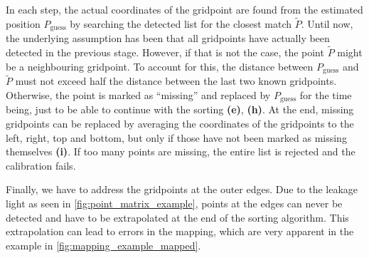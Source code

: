 In each step, the actual coordinates of the gridpoint are found from the estimated position $P_\text{guess}$ by searching the detected list for the closest match $\tilde{P}$. Until now, the underlying assumption has been that all gridpoints have actually been detected in the previous stage. However, if that is not the case, the point $\tilde{P}$ might be a neighbouring gridpoint. To account for this, the distance between $P_\text{guess}$ and $\tilde{P}$ must not exceed half the distance between the last two known gridpoints. Otherwise, the point is marked as \enquote{missing} and replaced by $P_\text{guess}$ for the time being, just to be able to continue with the sorting \textbf{(e)}, \textbf{(h)}. At the end, missing gridpoints can be replaced by averaging the coordinates of the gridpoints to the left, right, top and bottom, but only if those have not been marked as missing themselves \textbf{(i)}. 
If too many points are missing, the entire list is rejected and the calibration fails.

Finally, we have to address the gridpoints at the outer edges. Due to the leakage light as seen in \cref{fig:point_matrix_example}, points at the edges can never be detected and have to be extrapolated at the end of the sorting algorithm. This extrapolation can lead to errors in the mapping, which are very apparent in the example in \cref{fig:mapping_example_mapped}.



